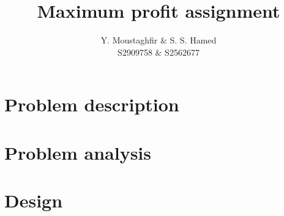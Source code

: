 \documentclass[a4paper,10pt]{article}
\title{Maximum profit assignment}
\author{Y. Moustaghfir \& S. S. Hamed\\
        S2909758 \& S2562677}
\begin{document}
\maketitle

\section{Problem description}
 

\section{Problem analysis}



\section{Design}
\end{document}
